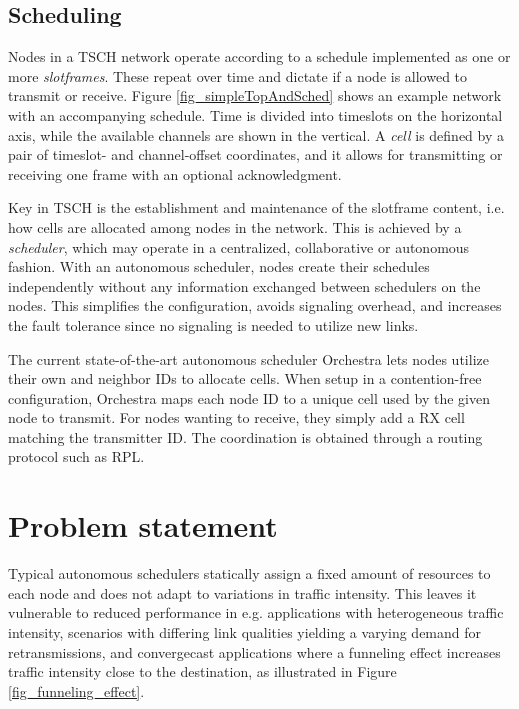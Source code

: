 \documentclass[journal,comsoc]{IEEEtran}
\begin{document}
\subsection{Scheduling}

Nodes in a TSCH network operate according to a schedule implemented as one or more \textit{slotframes}. These repeat over time and dictate if a node is allowed to transmit or receive. Figure \ref{fig_simpleTopAndSched} shows an example network with an accompanying schedule. Time is divided into timeslots on the horizontal axis, while the available channels are shown in the vertical. A \textit{cell} is defined by a pair of timeslot- and channel-offset coordinates, and it allows for transmitting or receiving one frame with an optional acknowledgment.

Key in TSCH is the establishment and maintenance of the slotframe content, i.e. how cells are allocated among nodes in the network. This is achieved by a \textit{scheduler}, which may operate in a centralized, collaborative or autonomous fashion. With an autonomous scheduler, nodes create their schedules independently without any information exchanged between schedulers on the nodes. This simplifies the configuration, avoids signaling overhead, and increases the fault tolerance since no signaling is needed to utilize new links.

The current state-of-the-art autonomous scheduler Orchestra \cite{OrchestraRobustMeshDuquennoy2015} lets nodes utilize their own and neighbor IDs to allocate cells. When setup in a contention-free configuration, Orchestra maps each node ID to a unique cell used by the given node to transmit. For nodes wanting to receive, they simply add a RX cell matching the transmitter ID. The coordination is obtained through a routing protocol such as RPL.

\section{Problem statement}

Typical autonomous schedulers statically assign a fixed amount of resources to each node and does not adapt to variations in traffic intensity. This leaves it vulnerable to reduced performance in e.g. applications with heterogeneous traffic intensity, scenarios with differing link qualities yielding a varying demand for retransmissions, and convergecast applications where a funneling effect increases traffic intensity close to the destination, as illustrated in Figure \ref{fig_funneling_effect}.
\end{document}
